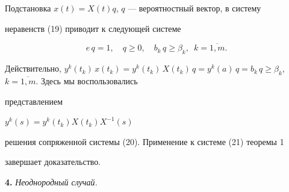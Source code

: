 \begin{pf}
Подстановка $x(t)=X(t)q$, $q$ --- вероятностный вектор, в систему


неравенств (19) приводит к следующей системе


\begin{equation}


e\,q=1,\quad q\ge 0,\quad b_k\,q\ge\beta_k,\; \ k=\overline{1,m}. %


\end{equation}


Действительно, $y^k(t_k)\,x(t_k)=y^k(t_k)\,X(t_k)\,q=y^k(a)\,q=


b_k\,q\ge \beta_k$, $k=\overline{1,m}$. Здесь мы воспользовались


представлением


$y^k(s)=y^k(t_k)X(t_k)X^{-1}(s)$


решения сопряженной системы (20). Применение к системе (21) теоремы 1


завершает доказательство.


\end{pf}





{\bf 4.} {\it Неоднородный случай.}





